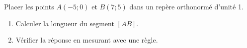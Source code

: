 
\begin{exercice}\label{exosmath-0483}

    Placer les points \( A(-5;0)\) et \( B(7;5)\) dans un repère orthonormé d'unité \unit{1}{\centi\meter}. 
    \begin{enumerate}
        \item
            Calculer la longueur du segment \( [AB]\).
        \item
            Vérifier la réponse en mesurant avec une règle.
    \end{enumerate}

\end{exercice}
